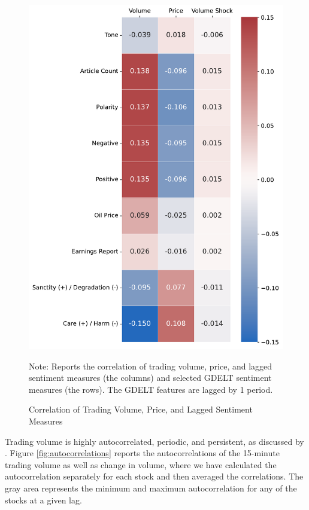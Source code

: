 \documentclass[12pt]{article}
\begin{document}
\begin{figure}[H]
    \centering
    \caption{Correlation of Trading Volume, Price, and Lagged Sentiment Measures}
    \includegraphics[width=0.6\linewidth]{../Output/correlations.pdf}
    \begin{minipage}{0.8\linewidth}
        \footnotesize
        \singlespacing
        Note: Reports the correlation of trading volume, price, and lagged sentiment measures (the columns) and selected GDELT sentiment measures (the rows). The GDELT features are lagged by 1 period.
    \end{minipage}
    \label{fig:lagged_volume}
\end{figure}

Trading volume is highly autocorrelated, periodic, and persistent, as discussed by \textcite{brownlees2011intra}. Figure \ref{fig:autocorrelations} reports the autocorrelations of the 15-minute trading volume as well as change in volume, where we have calculated the autocorrelation separately for each stock and then averaged the correlations. The gray area represents the minimum and maximum autocorrelation for any of the stocks at a given lag.
\end{document}
